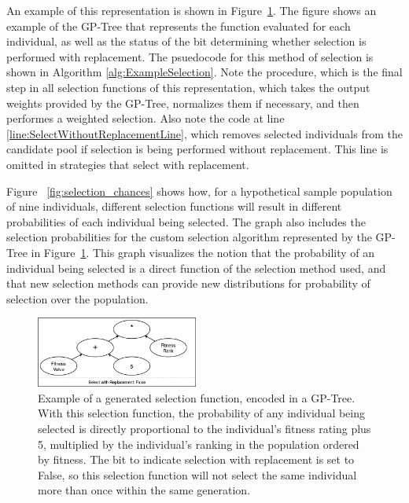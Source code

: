 \documentclass[sigconf]{acmart}
\begin{document}
An example of this representation is shown in Figure~\ref{fig:example_adpsea}. The figure shows an example of the GP-Tree that represents the function evaluated for each individual, as well as the status of the bit determining whether selection is performed with replacement. The psuedocode for this method of selection is shown in Algorithm \ref{alg:ExampleSelection}. Note the  procedure, which is the final step in all selection functions of this representation, which takes the output weights provided by the GP-Tree, normalizes them if necessary, and then performes a weighted selection. Also note the code at line \ref{line:SelectWithoutReplacementLine}, which removes selected individuals from the candidate pool if selection is being performed without replacement. This line is omitted in strategies that select with replacement.

Figure ~\ref{fig:selection_chances} shows how, for a hypothetical sample population of nine individuals, different selection functions will result in different probabilities of each individual being selected. The graph also includes the selection probabilities for the custom selection algorithm represented by the GP-Tree in Figure~\ref{fig:example_adpsea}. This graph visualizes the notion that the probability of an individual being selected is a direct function of the selection method used, and that new selection methods can provide new distributions for probability of selection over the population. 

\begin{figure}
    \centering
    \includegraphics[width=0.475\textwidth]{example_adpsea}
    \caption{Example of a generated selection function, encoded in a GP-Tree. With this selection function, the probability of any individual being selected is directly proportional to the individual's fitness rating plus 5, multiplied by the individual's ranking in the population ordered by fitness. The bit to indicate selection with replacement is set to False, so this selection function will not select the same individual more than once within the same generation.}
    \label{fig:example_adpsea}
\end{figure}
\end{document}
